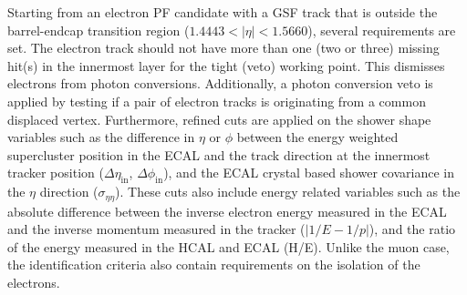 Starting from an electron PF candidate with a GSF track that is outside the barrel-endcap transition region ($1.4443 < |\eta| <1.5660$), several requirements are set. The electron track should not have more than one (two or three) missing hit(s) in the innermost layer for the tight (veto) working point. This dismisses electrons from photon conversions. Additionally, a photon conversion veto is applied by testing if a pair of electron tracks is originating from a common displaced vertex. Furthermore, refined cuts are applied on the shower shape variables such as the difference in $\eta$ or $\phi$ between the energy weighted supercluster position in the ECAL and the track direction  at the innermost tracker position ($\Delta \eta_{\mathrm{in}}$, $\Delta \phi_{\mathrm{in}}$), and the ECAL crystal based shower covariance in the $\eta$ direction ($\sigma_{\eta \eta}$). These cuts also include energy related variables such as the absolute difference between the inverse electron energy measured in the ECAL and the inverse momentum measured in the tracker ($|1/E-1/p|$), and the ratio of the energy measured in the HCAL and ECAL (H/E). Unlike the muon case, the identification criteria also contain requirements on the isolation of the electrons.

